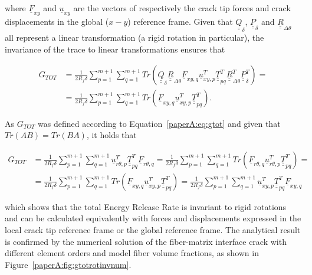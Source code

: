 where $\underline{F}_{xy}$ and $\underline{u}_{xy}$ are the vectors of respectively the crack tip forces and crack displacements in the global ($x-y$) reference frame. Given that $\underline{\underline{Q}}_{\delta}$, $\underline{\underline{P}}_{\delta}$ and $\underline{\underline{R}}_{\Delta\theta}$ all represent a linear transformation (a rigid rotation in particular), the invariance of the trace to linear transformations ensures that

\begin{equation}\label{paperA:eq:gtotlong2}
\begin{split}
G_{TOT}&=\frac{1}{2R_{f}\delta}\sum_{p=1}^{m+1}\sum_{q=1}^{m+1}Tr\left(\underline{\underline{Q}}_{\delta}\underline{\underline{R}}_{\Delta\theta}\underline{F}_{xy,q}\underline{u}_{xy,p}^{T}\underline{\underline{T}}_{pq}^{T}\underline{\underline{R}}_{\Delta\theta}^{T}\underline{\underline{P}}_{\delta}^{T}\right)=\\
&=\frac{1}{2R_{f}\delta}\sum_{p=1}^{m+1}\sum_{q=1}^{m+1}Tr\left(\underline{F}_{xy,q}\underline{u}_{xy,p}^{T}\underline{\underline{T}}_{pq}^{T}\right).
\end{split}
\end{equation}

As $G_{TOT}$ was defined according to Equation~\ref{paperA:eq:gtot} and given that $Tr\left(AB\right)=Tr\left(BA\right)$, it holds that

\begin{equation}\label{paperA:eq:gtotrotinv}
\begin{split}
G_{TOT} &= \frac{1}{2R_{f}\delta}\sum_{p=1}^{m+1}\sum_{q=1}^{m+1}\underline{u}_{r\theta,p}^{T}\underline{\underline{T}}_{pq}^{T}\underline{F}_{r\theta,q}=\frac{1}{2R_{f}\delta}\sum_{p=1}^{m+1}\sum_{q=1}^{m+1}Tr\left(\underline{F}_{r\theta,q}\underline{u}_{r\theta,p}^{T}\underline{\underline{T}}_{pq}^{T}\right)=\\
&=\frac{1}{2R_{f}\delta}\sum_{p=1}^{m+1}\sum_{q=1}^{m+1}Tr\left(\underline{F}_{xy,q}\underline{u}_{xy,p}^{T}\underline{\underline{T}}_{pq}^{T}\right)=\frac{1}{2R_{f}\delta}\sum_{p=1}^{m+1}\sum_{q=1}^{m+1}\underline{u}_{xy,p}^{T}\underline{\underline{T}}_{pq}^{T}\underline{F}_{xy,q}
\end{split}
\end{equation}

which shows that the total Energy Release Rate is invariant to rigid rotations and can be calculated equivalently with forces and displacements expressed in the local crack tip reference frame or the global reference frame. The analytical result is confirmed by the numerical solution of the fiber-matrix interface crack with different element orders and model fiber volume fractions, as shown in Figure~\ref{paperA:fig:gtotrotinvnum}.

